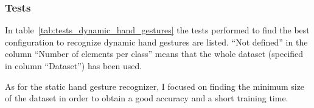 \documentclass[../thesis.tex]{subfiles}
\begin{document}
\subsubsection{Tests}
In table~\ref{tab:tests_dynamic_hand_gestures} the tests performed to find the best configuration to recognize dynamic hand gestures are listed. ``Not defined'' in the column ``Number of elements per class'' means that the whole dataset (specified in column ``Dataset'') has been used.
\begin{table}[H]
\caption{Training configurations for the dynamic hand gesture classifier.}
\label{tab:tests_dynamic_hand_gestures}
\end{table}

As for the static hand gesture recognizer, I focused on finding the minimum size of the dataset in order to obtain a good accuracy and a short training time.
\end{document}
